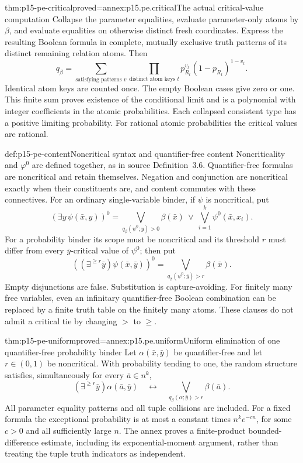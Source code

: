 \begin{hbtheorem}{thm:p15-pe-critical}{proved=annex:p15.pe.critical}{The actual critical-value computation}
Collapse the parameter equalities, evaluate parameter-only atoms by
\(\beta\), and evaluate equalities on otherwise distinct fresh coordinates.
Express the resulting Boolean formula in complete, mutually exclusive
truth patterns of its distinct remaining relation atoms. Then
\[
 q_\beta=\sum_{\text{satisfying patterns }v}
             \prod_{\text{distinct atom keys }t}
                  p_{R_t}^{v_t}(1-p_{R_t})^{1-v_t}.
\]
Identical atom keys are counted once. The empty Boolean cases give zero
or one. This finite sum proves existence of the conditional limit and
is a polynomial with integer coefficients in the atomic probabilities.
Each collapsed consistent type has a positive limiting probability.
For rational atomic probabilities the critical values are rational.
\end{hbtheorem}

\begin{hbdefinition}{def:p15-pe-content}{Noncritical syntax and quantifier-free content}
Noncriticality and \(\varphi^0\) are defined together, as in source
Definition~3.6. Quantifier-free formulas are noncritical and retain
themselves. Negation and conjunction are noncritical exactly when their
constituents are, and content commutes with these connectives. For an
ordinary single-variable binder, if \(\psi\) is noncritical, put
\[
 (\exists y\,\psi(\bar x,y))^0
   =\bigvee_{q_\beta(\psi^0;y)>0}\beta(\bar x)
       \ \vee\ \bigvee_{i=1}^{k}\psi^0(\bar x,x_i).
\]
For a probability binder its scope must be noncritical and its threshold
\(r\) must differ from every \(\bar y\)-critical value of \(\psi^0\);
then put
\[
 ((\exists^{\ge r}\bar y)\psi(\bar x,\bar y))^0
       =\bigvee_{q_\beta(\psi^0;\bar y)>r}\beta(\bar x).
\]
Empty disjunctions are false. Substitution is capture-avoiding.
For finitely many free variables, even an infinitary quantifier-free
Boolean combination can be replaced by a finite truth table on the
finitely many atoms. These clauses do not admit a critical tie by
changing \(>\) to \(\ge\).
\end{hbdefinition}

\begin{hbtheorem}{thm:p15-pe-uniform}{proved=annex:p15.pe.uniform}{Uniform elimination of one quantifier-free probability binder}
Let \(\alpha(\bar x,\bar y)\) be quantifier-free and let \(r\in(0,1)\)
be noncritical. With probability tending to one, the random structure
satisfies, simultaneously for every \(\bar a\in n^k\),
\[
 (\exists^{\ge r}\bar y)\alpha(\bar a,\bar y)
 \quad\longleftrightarrow\quad
       \bigvee_{q_\beta(\alpha;\bar y)>r}\beta(\bar a).
\]
All parameter equality patterns and all tuple collisions are included.
For a fixed formula the exceptional probability is at most a constant
times \(n^k e^{-c n}\), for some \(c>0\) and all sufficiently large \(n\).
The annex proves a finite-product bounded-difference estimate, including
its exponential-moment argument, rather than treating the tuple truth
indicators as independent.
\end{hbtheorem}

